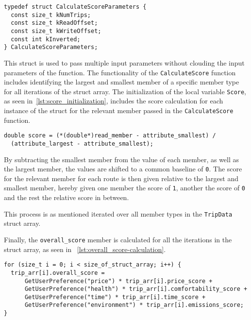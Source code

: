 \begin{lstlisting}[caption={Declaration of \texttt{CalculateScoreParameters} struct},
    label={lst:CalculateScoreParameters-declaration}]
typedef struct CalculateScoreParameters {
  const size_t kNumTrips;
  const size_t kReadOffset;
  const size_t kWriteOffset;
  const int kInverted;
} CalculateScoreParameters;
\end{lstlisting}

This struct is used to pass multiple input parameters without clouding the input parameters of the function.
The functionality of the \texttt{CalculateScore} function includes identifying the largest and smallest member of a
specific member type for all iterations of the struct array.
The initialization of the local variable \texttt{Score}, as seen in~\ref{lst:score_initialization}, includes the score
calculation for each instance of the struct for the relevant member passed in the \texttt{CalculateScore} function.

\begin{lstlisting}[caption={Initialization of \texttt{Score}}, label={lst:score_initialization}]
double score = (*(double*)read_member - attribute_smallest) /
  (attribute_largest - attribute_smallest);
\end{lstlisting}

By subtracting the smallest member from the value of each member, as well as the largest member, the values are shifted
to a common baseline of \texttt{0}.
The score for the relevant member for each route is then given relative to the largest and smallest member, hereby
given one member the score of \texttt{1}, another the score of \texttt{0} and the rest the relative score in between.

This process is as mentioned iterated over all member types in the \texttt{TripData} struct array.

Finally, the \texttt{overall\_score} member is calculated for all the iterations in the struct array, as seen in
~\ref{lst:overall_score-calculation}.

\begin{lstlisting}[caption={Calculation of \texttt{overall\_score}}, label={lst:overall_score-calculation}]
for (size_t i = 0; i < size_of_struct_array; i++) {
  trip_arr[i].overall_score =
      GetUserPreference("price") * trip_arr[i].price_score +
      GetUserPreference("health") * trip_arr[i].comfortability_score +
      GetUserPreference("time") * trip_arr[i].time_score +
      GetUserPreference("environment") * trip_arr[i].emissions_score;
}
\end{lstlisting}




